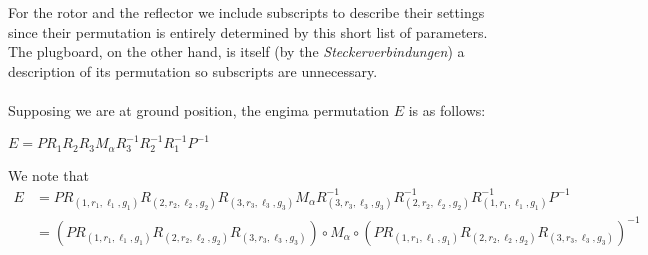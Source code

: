 For the rotor and the reflector we include subscripts to describe
their settings since their permutation is entirely determined by this
short list of parameters.
The plugboard, on the other hand, is itself (by the
\emph{Steckerverbindungen}) a description of its permutation so
subscripts are unnecessary.
\\\\Supposing we are at ground position, the engima permutation $E$
is as follows:
\begin{center}
  $E = PR_1R_2R_3M_\alpha R_3^{-1} R_2^{-1} R_1^{-1} P^{-1}$
\end{center}
\noindent We note that
\begin{align*}
  E &= PR_{(1,r_1, \ell_1, g_1)}R_{(2, r_2, \ell_2, g_2)}R_{(3, r_3,
  \ell_3, g_3)}M_\alpha R_{(3, r_3, \ell_3, g_3)}^{-1} R_{(2, r_2,
  \ell_2, g_2)}^{-1} R_{(1,r_1, \ell_1, g_1)}^{-1} P^{-1}
  \\&=(PR_{(1,r_1, \ell_1, g_1)}R_{(2, r_2, \ell_2, g_2)}R_{(3, r_3,
  \ell_3, g_3)})\circ M_\alpha \circ(PR_{(1,r_1, \ell_1, g_1)}R_{(2,
  r_2, \ell_2, g_2)}R_{(3, r_3, \ell_3, g_3)})^{-1}
\end{align*}
